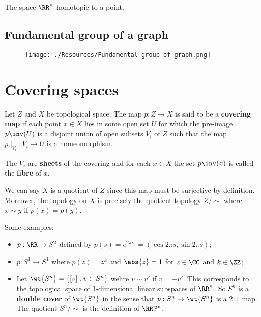 \documentclass[12pt, a4paper]{article}
\begin{document}
\begin{example}
    The space \(\RR^n\) homotopic to a point.
\end{example}

\subsection{Fundamental group of a graph}

\begin{figure}[H]
     \begin{center}
         \texttt{[image: ./Resources/Fundamental group of graph.png]}
     \end{center}
\end{figure}

\section{Covering spaces}

\begin{definition}
    Let \(Z\) and \(X\) be topological space. The map \(p:Z \to X\) is said to be a \textbf{covering map} if each point \(x \in X\) lies in some open set \(U\) for which the pre-image \(p\inv(U)\) is a  disjoint union of open subsets \(V_i\) of \(Z\) such that the map \(p\mid_{V_i} : V_i \to U\) is a \ul{homeomorphism}. 
\end{definition}

\begin{mdnote}
    The \(V_i\) are \textbf{sheets} of the covering and for each \(x\in X\) the set \(p\inv(x)\) is called the \textbf{fibre} of \(x\).
\end{mdnote}

\begin{proposition}
    We can say \(X\) is a quotient of \(Z\) since this map must be surjective by definition. Moreover, the topology on \(X\) is precisely the quotient topology \(Z/\sim\) where \(x\sim y\) if \(p(x)=p(y)\).
\end{proposition}

\begin{mdexample}
    Some examples:
    \begin{itemize}
        \item \(p:\RR \to S^2\) defined by \(p(s)=e^{2\pi i s }=(\cos 2\pi s,\sin 2\pi s)\);
        \item \(p:S^1 \to S^1\) where \(p(z)=z^k\) and \(\abs{z}=1\) for \(z\in \CC\) and \(k\in \ZZ\);
        \item Let \(\wt{S^n} = \left\{ [v] :v\in S^n \right\}\)  wehre \(v\sim v'\) if \(v=-v'\). This corresponds to the topological space of \(1\)-dimensional linear subspaces of \(\RR^n\). So \(S^n\) is a \textbf{double cover} of \(\wt{S^n}\) in the sense that \(p:S^n \to \wt{S^n}\) is a \(2:1\) map. The quotient \(S^n/\sim\) is the definition of \(\RR\mathbb{P}^n\).
    \end{itemize}
\end{mdexample}
\end{document}
